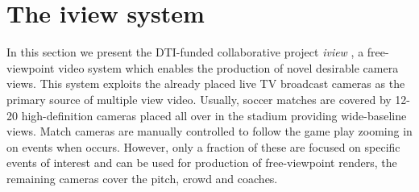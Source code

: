 
\section{The iview system}
In this section we present the DTI-funded collaborative project \textit{iview} \cite{iview_project},
a free-viewpoint video system which enables the production of novel desirable camera views.
This system exploits the already placed live TV broadcast cameras as the primary
source of multiple view video.
Usually, soccer matches are covered by 12-20 high-definition cameras placed all over in the stadium
providing wide-baseline views.
Match cameras are manually controlled to follow the game play zooming in on events when occurs.
However, only a fraction of these are focused on specific events of interest and can be used for production 
of free-viewpoint renders, the remaining cameras cover the pitch, crowd and coaches.






